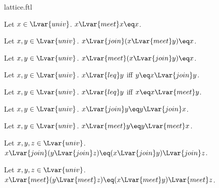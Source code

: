 \documentclass{stex}
\begin{document}
\begin{smodule}{lattice.ftl}
\begin{proposition*}[forthel,id=MeetIdempotenceThm,printid]
  Let $x\in\Lvar{univ}$.
  $x{\Lvar{meet}}x\eq x$.
\end{proposition*}

\begin{proposition*}[forthel,id=JoinAbsorbsMeetThm,printid]
  Let $x,y\in\Lvar{univ}$.
  $x{\Lvar{join}}(x{\Lvar{meet}}y)\eq x$.
\end{proposition*}

\begin{proposition*}[forthel,id=MeetAbsorbsJoinThm,printid]
  Let $x,y\in\Lvar{univ}$.
  $x{\Lvar{meet}}(x{\Lvar{join}}y)\eq x$.
\end{proposition*}

\begin{proposition*}[forthel,id=PrecedingIffJoinEqualsLargerOperandThm,printid]
  Let $x,y\in\Lvar{univ}$.
  $x{\Lvar{leq}}y$ iff $y\eq x{\Lvar{join}}y$.
\end{proposition*}

\begin{proposition*}[forthel,id=PrecedingIffMeetEqualsLargerOperandThm,printid]
  Let $x,y\in\Lvar{univ}$.
  $x{\Lvar{leq}}y$ iff $x\eq x{\Lvar{meet}}y$.
\end{proposition*}

\begin{proposition*}[forthel,id=JoinIsCommutativeThm,printid]
  Let $x,y\in\Lvar{univ}$.
  $x{\Lvar{join}}y\eq y{\Lvar{join}}x$.
\end{proposition*}

\begin{proposition*}[forthel,id=MeetIsCommutativeThm,printid]
  Let $x,y\in\Lvar{univ}$.
  $x{\Lvar{meet}}y\eq y{\Lvar{meet}}x$.
\end{proposition*}

\begin{proposition*}[forthel,id=JoinIsAssociativeThm,printid]
  Let $x,y,z\in\Lvar{univ}$.
  $x{\Lvar{join}}(y{\Lvar{join}}z)\eq (x{\Lvar{join}}y){\Lvar{join}}z$.
\end{proposition*}

\begin{proposition*}[forthel,id=MeetIsAssociativeThm,printid]
  Let $x,y,z\in\Lvar{univ}$.
  $x{\Lvar{meet}}(y{\Lvar{meet}}z)\eq (x{\Lvar{meet}}y){\Lvar{meet}}z$.
\end{proposition*}
\end{smodule}
\end{document}
